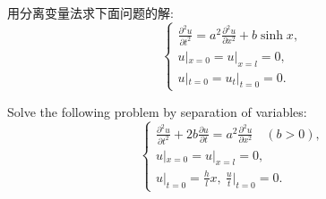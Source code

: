 \begin{exercise}
  用分离变量法求下面问题的解:
  \[\begin{cases}
    \frac{\partial^2u}{\partial t^2} = a^2 \frac{\partial^2u}{\partial x^2} + b\sinh x, \\
    u|_{x=0} = u|_{x=l} = 0, \\
    u|_{t=0} = u_t|_{t=0} = 0.
  \end{cases}\]
\end{exercise}



\begin{exercise}
  Solve the following problem by separation of variables:
  \[\begin{cases}
    \frac{\partial^2 u}{\partial t^2} + 2b \frac{\partial u}{\partial t}
      = a^2 \frac{\partial^2u}{\partial x^2} \quad (b>0), \\
    u|_{x=0} = u|_{x=l} = 0, \\
    u|_{t=0} = \frac{h}{l}x,\ \frac{u}{t}\big|_{t=0} = 0.
  \end{cases}\]
\end{exercise}



